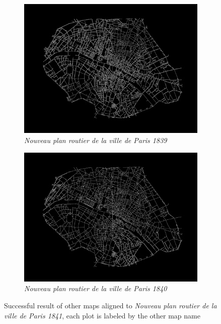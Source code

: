 \begin{figure}[h!]
     \centering
     \captionsetup{width=.9\textwidth, justification=centering}
     \begin{subfigure}{0.9\textwidth}
         \centering
         \includegraphics[width=\textwidth]{Images/Map other/map_7_allignment_radius_120.png}
         \caption{\textit{Nouveau plan routier de la ville de Paris 1839}}
     \end{subfigure}
     \hfill
     \begin{subfigure}{0.9\textwidth}
         \centering
         \includegraphics[width=\textwidth]{Images/Map other/map_10_allignment_radius_110.png}
         \caption{\textit{Nouveau plan routier de la ville de Paris 1840}}
     \end{subfigure}
        \caption{Successful result of other maps aligned to \textit{Nouveau plan routier de la ville de Paris 1841}, each plot is labeled by the other map name}
        \label{orb2}
\end{figure}

